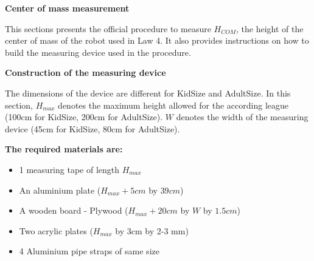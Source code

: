 \clearpage
\sffamily
{\bfseries\color[rgb]{0.4,0.4,0.4} Center of mass measurement}
{}

\bigskip

This sections presents the official procedure to measure $H_{COM}$,
the height of the center of mass of the robot used in Law 4.
It also provides instructions on how to build the measuring device used in the
procedure.

\bigskip

{\bfseries Construction of the measuring device}

\headlinebox

The dimensions of the device are different for KidSize and AdultSize.
In this section, $H_{max}$ denotes the maximum height allowed for the
according league (100cm for KidSize, 200cm for AdultSize).
$W$ denotes the width of the measuring device (45cm for KidSize, 80cm for
AdultSize).

\bigskip

\textbf{The required materials are:}
\begin{itemize}
\item 1 measuring tape of length $H_{max}$
\item An aluminium plate ($H_{max}+5cm$ by $39cm$)
\item A wooden board - Plywood ($H_{max}+20cm$ by $W$ by $1.5cm$)
\item Two acrylic plates ($H_{max}$ by 3cm by 2-3 mm)
\item 4 Aluminium pipe straps of same size
\end{itemize}

